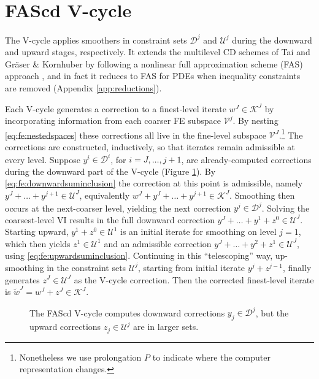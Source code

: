 \documentclass[letterpaper,final,12pt,reqno]{amsart}
\theoremstyle{cstyle}
\theoremstyle{cstyle*}
\theoremstyle{dstyle}
\numberwithin{equation}{section}
\numberwithin{figure}{section}
\numberwithin{table}{section}
\numberwithin{theorem}{section}
\begin{document}
\section{FAScd V-cycle} \label{sec:vcycle}

The V-cycle applies smoothers in constraint sets $\mathcal{D}^j$ and $\mathcal{U}^j$ during the downward and upward stages, respectively.  It extends the multilevel CD schemes of Tai \cite{Tai2003} and Gr\"aser \& Kornhuber \cite[Algorithm 4.7]{GraeserKornhuber2009} by following a nonlinear full approximation scheme (FAS) approach \cite{BrandtLivne2011}, and in fact it reduces to FAS for PDEs when inequality constraints are removed (Appendix \ref{app:reductions}).

Each V-cycle generates a correction to a finest-level iterate $w^J \in \mathcal{K}^J$ by incorporating information from each coarser FE subspace $\mathcal{V}^j$.  By nesting \eqref{eq:fe:nestedspaces} these corrections all live in the fine-level subspace $\mathcal{V}^J$.\footnote{Nonetheless we use prolongation $P$ to indicate where the computer representation changes.}  The corrections are constructed, inductively, so that iterates remain admissible at every level.  Suppose $y^i \in \mathcal{D}^i$, for $i=J,\dots,j+1$, are already-computed corrections during the downward part of the V-cycle (Figure \ref{fig:fascdvcycle}).  By \eqref{eq:fe:downwardsuminclusion} the correction at this point is admissible, namely $y^J + \dots + y^{j+1} \in \mathcal{U}^J$, equivalently $w^J + y^J + \dots + y^{j+1} \in \mathcal{K}^J$.  Smoothing then occurs at the next-coarser level, yielding the next correction $y^j \in \mathcal{D}^j$.  Solving the coarsest-level VI results in the full downward correction $y^J + \dots + y^1 + z^0 \in \mathcal{U}^J$.  Starting upward, $y^1 + z^0 \in \mathcal{U}^1$ is an initial iterate for smoothing on level $j=1$, which then yields $z^1 \in \mathcal{U}^1$ and an admissible correction $y^J + \dots + y^2 + z^1 \in \mathcal{U}^J$, using \eqref{eq:fe:upwardsuminclusion}.  Continuing in this ``telescoping'' way, up-smoothing in the constraint sets $\mathcal{U}^j$, starting from initial iterate $y^j+z^{j-1}$, finally generates $z^J\in \mathcal{U}^J$ as the V-cycle correction.  Then the corrected finest-level iterate is $\tilde{w}^J = w^J + z^J \in \mathcal{K}^J$.

\begin{figure}[ht]
\begin{center}

\end{center}
\caption{The FAScd V-cycle computes downward corrections $y_j \in \mathcal{D}^j$, but the upward corrections $z_j\in\mathcal{U}^j$ are in larger sets.}
\label{fig:fascdvcycle}
\end{figure}
\end{document}
